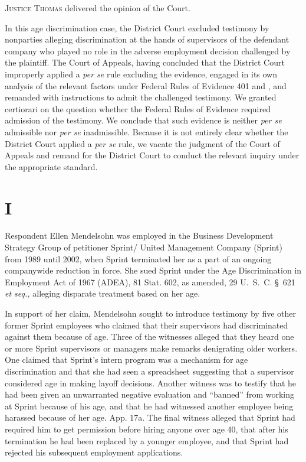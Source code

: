 
\setcounter{page}{380}

  \textsc{Justice Thomas} delivered the opinion of the Court.

  In this age discrimination case, the District Court excluded testimony
by nonparties alleging discrimination at the hands of supervisors of the
defendant company who played no role in the adverse employment decision
challenged by the plaintiff. The Court of Appeals, having concluded
that the District Court improperly applied a \emph{per se} rule excluding
the evidence, engaged in its own analysis of the relevant factors
under Federal Rules of Evidence 401 and , and remanded with
instructions to admit the challenged testimony. We granted certiorari on
the question whether the Federal Rules of Evidence required admission
of the testimony. We conclude that such evidence is neither \emph{per se}
admissible nor \emph{per se} inadmissible. Because it is not entirely clear
whether the District Court applied a \emph{per se} rule, we vacate the
judgment of the Court of Appeals and remand for the District Court to
conduct the relevant inquiry under the appropriate standard.

\section{I}

  Respondent Ellen Mendelsohn was employed in the Business Development
Strategy Group of petitioner Sprint/ United Management Company (Sprint)
from 1989 until 2002, when Sprint terminated her as a part of an
ongoing companywide reduction in force. She sued Sprint under the
Age Discrimination in Employment Act of 1967 (ADEA), 81 Stat. 602,
as amended, 29 U.~S.~C. \S~621 \emph{et seq.,} alleging disparate
treatment based on her age.

  In support of her claim, Mendelsohn sought to introduce testimony by
five other former Sprint employees who claimed that their supervisors
had discriminated against them because of age. Three of the witnesses
alleged that they heard one or more Sprint supervisors or managers make
remarks denigrating older workers. One claimed that Sprint's intern
program was a mechanism for age discrimination and that she had seen
a spreadsheet suggesting that a supervisor considered age in making
layoff decisions. Another witness was to testify that he had been given
an unwarranted negative evaluation and ``banned'' from working at
Sprint because of his age, and that he had witnessed another employee
being harassed because of her age. App. 17a. The final witness
alleged that Sprint had required him to get permission before hiring
anyone over age 40, that after his termination he had been replaced by a
younger employee, and that Sprint had rejected his subsequent employment
applications. \newpage 

